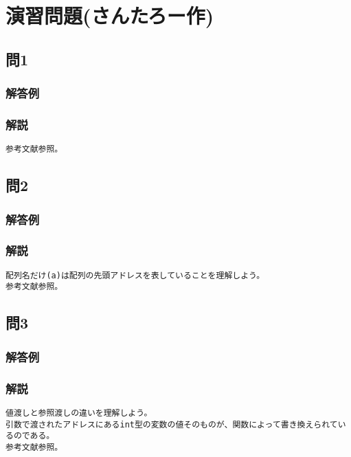 \section{演習問題(さんたろー作)}
\subsection{問1}
\subsubsection{解答例}

\subsubsection{解説}
\begin{verbatim}
参考文献参照。

\end{verbatim}

\subsection{問2}
\subsubsection{解答例}

\subsubsection{解説}
\begin{verbatim}
配列名だけ(a)は配列の先頭アドレスを表していることを理解しよう。
参考文献参照。

\end{verbatim}

\subsection{問3}
\subsubsection{解答例}

\subsubsection{解説}
\begin{verbatim}
値渡しと参照渡しの違いを理解しよう。
引数で渡されたアドレスにあるint型の変数の値そのものが、関数によって書き換えられているのである。
参考文献参照。
\end{verbatim}

